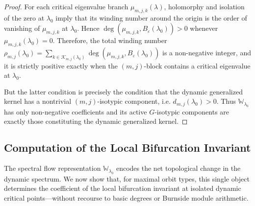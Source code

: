\documentclass[twoside,11pt]{article}
\begin{document}
\begin{proof}
For each critical eigenvalue branch $\mu_{m,j,k}(\lambda)$, holomorphy and
isolation of the zero at $\lambda_0$ imply that its winding number around the
origin is the order of vanishing of $\mu_{m,j,k}$ at $\lambda_0$. Hence
$\deg(\mu_{m,j,k},B_\varepsilon(\lambda_0))>0$
whenever $\mu_{m,j,k}(\lambda_0)=0$. Therefore, the total winding number $\rho_{m,j}(\lambda_0)
= \sum_{k\in\mathcal K_{m,j}(\lambda_0)}
\deg(\mu_{m,j,k},B_\varepsilon(\lambda_0))$ is a non-negative integer, and it is strictly positive exactly when the $(m,j)$-block contains a critical eigenvalue at $\lambda_0$.

But the latter condition is precisely the condition that the dynamic
generalized kernel has a nontrivial $(m,j)$-isotypic component, i.e.
$d_{m,j}(\lambda_0)>0$. Thus $\mathbb W_{\lambda_0}$ has only non-negative
coefficients and its active $G$-isotypic components are exactly those constituting the dynamic generalized kernel.
\end{proof}

\subsection{Computation of the Local Bifurcation Invariant}
The spectral flow representation $\mathbb{W}_{\lambda_0}$ encodes the net topological change in the dynamic spectrum.  We now show that, for maximal orbit types, this single object determines the coefficient of the local bifurcation invariant at isolated dynamic critical points---without recourse to basic degrees or Burnside module arithmetic.
\end{document}
